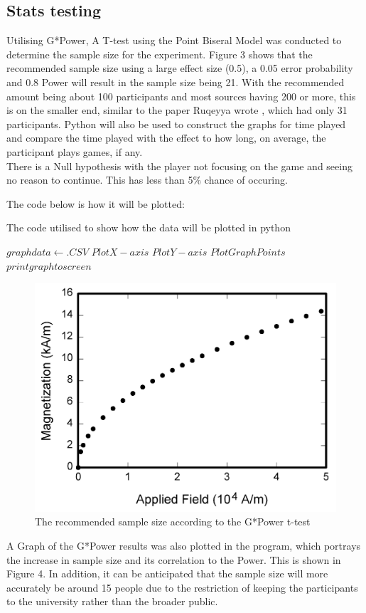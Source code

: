 \documentclass[conference]{IEEEtran}
\begin{document}
\subsection{Stats testing}
Utilising G*Power, A T-test using the Point Biseral Model was conducted to determine the sample size for the experiment. Figure 3 shows that the recommended sample size using a large effect size (0.5), a 0.05 error probability and 0.8 Power will result in the sample size being 21.  With the recommended amount being about 100 participants and most sources having 200 or more, this is on the smaller end, similar to the paper Ruqeyya wrote \cite{Ruqeyya2022}, which had only 31 participants.  Python will also be used to construct the graphs for time played and compare the time played with the effect to how long, on average, the participant plays games, if any.\\

There is a Null hypothesis with the player not focusing on the game and seeing no reason to continue. This has less than 5\% chance of occuring. 

The code below is how it will be plotted:
\begin{algorithm}
\caption{The code utilised to show how the data will be plotted in python}
\begin{algorithmic}
\STATE $ graph data \gets .CSV $
	\STATE $Plot X-axis$
	\STATE $Plot Y-axis$
	\STATE $Plot Graph Points$
\ENDFOR
\STATE $printgraphtoscreen$
\end{algorithmic}
\end{algorithm}

\begin{figure}[H]
\includegraphics[width =0.5 \textwidth]{fig1}
\caption{The recommended sample size according to the G*Power t-test}
\label{tab:figure3}
\end{figure}

A Graph of the G*Power results was also plotted in the program, which portrays the increase in sample size and its correlation to the Power. This is shown in Figure 4. In addition, it can be anticipated that the sample size will more accurately be around 15 people due to the restriction of keeping the participants to the university rather than the broader public. 
\end{document}
